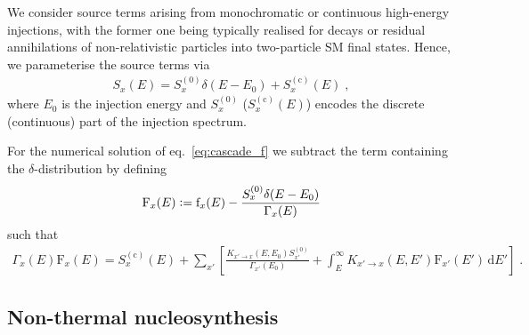 \documentclass[11pt,a4paper]{article}
\newcommand{\fpdi}{\mathrm{f}}
\newcommand{\Fpdi}{\mathrm{F}}
\renewcommand{\d}{\text{d}}
\newcommand{\eqsp}{\;}
\newcommand{\X}{x}
\newcommand{\ldefine}{\vcentcolon=}
\begin{document}
We consider source terms arising from monochromatic or continuous high-energy injections, with the former one being typically realised for decays or residual annihilations of non-relativistic particles into two-particle SM final states.
Hence, we parameterise the source terms via
\begin{align}
S_\X(E) = S_\X^{(0)} \delta(E-E_0) + S_\X^{(\text{c})}(E)\eqsp,
\label{eq:SXE_definition}
\end{align}
where $E_0$ is the injection energy and $S_\X^{(0)}$ ($S_\X^{(\text{c})}(E)$) encodes the discrete (continuous) part of the injection spectrum.


For the numerical solution of eq.~\eqref{eq:cascade_f} we subtract the term containing the $\delta$-distribution by defining
\begin{align}
\Fpdi_\X(E) \ldefine \fpdi_\X(E) - \frac{S_\X^{(0)} \delta(E-E_0)}{\Gamma_\X(E)}
\label{eq:Ff_relation}
\end{align}
such that
\begin{align}
\Gamma_\X(E) \Fpdi_\X(E) = S_{\X}^{(\text{c})}(E) + \sum_{\X'} \left[ \frac{K_{\X' \to \X} (E, E_0) S_{\X'}^{(0)}}{\Gamma_{\X'} (E_0)} + \int_{E}^{\infty} K_{\X' \to \X} (E, E') \Fpdi_{\X'}(E')\,\d E'\right] \eqsp.
\label{eq:cascade_full}
\end{align}

\subsection{Non-thermal nucleosynthesis}
\end{document}
